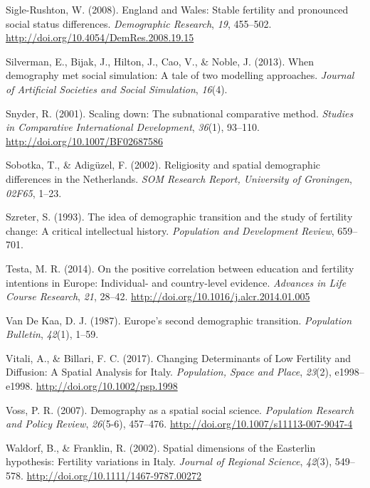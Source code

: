 \documentclass[12pt,twoside]{reedthesis}
\begin{document}
\leavevmode\hypertarget{ref-sigle-rushton2008}{}%
Sigle-Rushton, W. (2008). England and Wales: Stable fertility and pronounced social status differences. \emph{Demographic Research}, \emph{19}, 455--502. \url{http://doi.org/10.4054/DemRes.2008.19.15}

\leavevmode\hypertarget{ref-silverman2013}{}%
Silverman, E., Bijak, J., Hilton, J., Cao, V., \& Noble, J. (2013). When demography met social simulation: A tale of two modelling approaches. \emph{Journal of Artificial Societies and Social Simulation}, \emph{16}(4).

\leavevmode\hypertarget{ref-snyder2001}{}%
Snyder, R. (2001). Scaling down: The subnational comparative method. \emph{Studies in Comparative International Development}, \emph{36}(1), 93--110. \url{http://doi.org/10.1007/BF02687586}

\leavevmode\hypertarget{ref-sobotka2002}{}%
Sobotka, T., \& Adigüzel, F. (2002). Religiosity and spatial demographic differences in the Netherlands. \emph{SOM Research Report, University of Groningen}, \emph{02F65}, 1--23.

\leavevmode\hypertarget{ref-szreter1993}{}%
Szreter, S. (1993). The idea of demographic transition and the study of fertility change: A critical intellectual history. \emph{Population and Development Review}, 659--701.

\leavevmode\hypertarget{ref-testa2014}{}%
Testa, M. R. (2014). On the positive correlation between education and fertility intentions in Europe: Individual- and country-level evidence. \emph{Advances in Life Course Research}, \emph{21}, 28--42. \url{http://doi.org/10.1016/j.alcr.2014.01.005}

\leavevmode\hypertarget{ref-vandekaa1987}{}%
Van De Kaa, D. J. (1987). Europe's second demographic transition. \emph{Population Bulletin}, \emph{42}(1), 1--59.

\leavevmode\hypertarget{ref-vitali2017}{}%
Vitali, A., \& Billari, F. C. (2017). Changing Determinants of Low Fertility and Diffusion: A Spatial Analysis for Italy. \emph{Population, Space and Place}, \emph{23}(2), e1998--e1998. \url{http://doi.org/10.1002/psp.1998}

\leavevmode\hypertarget{ref-voss2007}{}%
Voss, P. R. (2007). Demography as a spatial social science. \emph{Population Research and Policy Review}, \emph{26}(5-6), 457--476. \url{http://doi.org/10.1007/s11113-007-9047-4}

\leavevmode\hypertarget{ref-waldorf2002}{}%
Waldorf, B., \& Franklin, R. (2002). Spatial dimensions of the Easterlin hypothesis: Fertility variations in Italy. \emph{Journal of Regional Science}, \emph{42}(3), 549--578. \url{http://doi.org/10.1111/1467-9787.00272}
\end{document}
